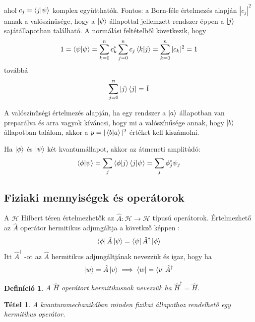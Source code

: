 \documentclass[12pt]{article}
\theoremstyle{plain}
\newtheorem*{theorem*}{Tétel}
\newtheorem*{def*}{Definíció}
\begin{document}
ahol  $c_j = \braket{j|\psi}$ komplex együtthatók. Fontos: a Born-féle értelmezés alapján $|c_j|^2$ annak a valószínűsége, hogy a $\ket\psi$ állapottal jellemzett
rendszer éppen a $\ket j$ sajátállapotban található.
A normálási feltételből következik, hogy 
\begin{equation}
    1=\braket{\psi|\psi} = \sum\limits_{k=0}^{n} c_k^* \sum\limits_{j=0}^{n} c_j \braket{k|j} = \sum\limits_{k=0}^{n} |c_k|^2 = 1
\end{equation}
továbbá
\begin{equation}
    \sum\limits_{j=0}^{n} \ket j \bra j = \hat{1}
\end{equation}

A valószínűségi értelmezés alapján, ha egy rendszer a $\ket a$ állapotban van preparálva és arra vagyok kíváncsi, hogy mi a valószínűsége annak,
hogy $\ket b$ állapotban találom, akkor a $p = |\braket{b|a}|^2$ értéket kell kiszámolni.

Ha $\ket\phi$ és $\ket\psi$ két kvantumállapot, akkor az átmeneti amplitúdó:
\begin{equation}
    \braket{\phi|\psi} = \sum\limits_j \braket{\phi|j}\braket{j|\psi} = \sum\limits_j \phi_j^{*}\psi_j
\end{equation}
\subsection{Fiziaki mennyiségek és operátorok}
A $\mathcal{H}$ Hilbert téren értelmezhetők az $\hat{A} : \mathcal{H} \rightarrow \mathcal{H}$  típusú operátorok.
Értelmezhető az $\hat{A}$ operátor hermitikus adjungáltja a követkző képpen :
\begin{equation}
    \bra \phi \hat{A} \ket \psi = \bra \psi \hat{A}^\dag \ket \phi
\end{equation}
Itt $\hat{A}^\dag$ -ot az $\hat{A}$ hermitikus adjungáltjának nevezzük és igaz, hogy ha
\begin{equation}
    \ket w = \hat{A}\ket v \implies \bra w = \bra v \hat{A}^\dag
\end{equation}

\begin{def*}
    A $\hat{H}$ operátort hermitikusnak nevezzük ha $\hat H^\dag = \hat H$.
\end{def*}

\begin{theorem*}
    A kvantummechanikában minden fizikai állapothoz rendelhető egy hermitikus operátor.
\end{theorem*}
\end{document}
